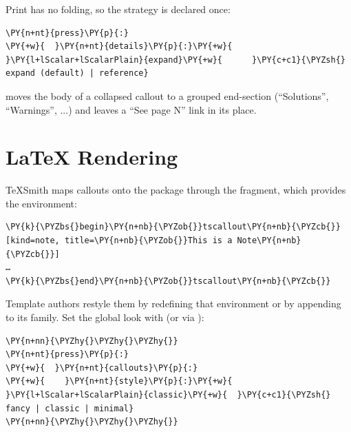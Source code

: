 \documentclass[a4paper,twoside]{article}
\begin{document}
Print has no folding, so the strategy is declared once:
\begin{tscode}[lang=yaml, engine=pygments]
\begin{Verbatim}[commandchars=\\\{\},breaklines, breakanywhere, commandchars=\\\{\}]
\PY{n+nt}{press}\PY{p}{:}
\PY{+w}{  }\PY{n+nt}{details}\PY{p}{:}\PY{+w}{ }\PY{l+lScalar+lScalarPlain}{expand}\PY{+w}{      }\PY{c+c1}{\PYZsh{} expand (default) | reference}
\end{Verbatim}
\end{tscode}
 moves the body of a collapsed callout to a grouped end-section
(``Solutions'', ``Warnings'', ...) and leaves a ``See page N'' link in its place.
\section{\LaTeX{} Rendering}
TeXSmith maps callouts onto the  package through the 
fragment, which provides the  environment:
\begin{tscode}[lang=latex, engine=pygments]
\begin{Verbatim}[commandchars=\\\{\},breaklines, breakanywhere, commandchars=\\\{\}]
\PY{k}{\PYZbs{}begin}\PY{n+nb}{\PYZob{}}tscallout\PY{n+nb}{\PYZcb{}}[kind=note, title=\PY{n+nb}{\PYZob{}}This is a Note\PY{n+nb}{\PYZcb{}}]
…
\PY{k}{\PYZbs{}end}\PY{n+nb}{\PYZob{}}tscallout\PY{n+nb}{\PYZcb{}}
\end{Verbatim}
\end{tscode}
Template authors restyle them by redefining that environment or by appending to
its  family. Set the global look with  (or via
):
\begin{tscode}[lang=yaml, engine=pygments]
\begin{Verbatim}[commandchars=\\\{\},breaklines, breakanywhere, commandchars=\\\{\}]
\PY{n+nn}{\PYZhy{}\PYZhy{}\PYZhy{}}
\PY{n+nt}{press}\PY{p}{:}
\PY{+w}{  }\PY{n+nt}{callouts}\PY{p}{:}
\PY{+w}{    }\PY{n+nt}{style}\PY{p}{:}\PY{+w}{ }\PY{l+lScalar+lScalarPlain}{classic}\PY{+w}{  }\PY{c+c1}{\PYZsh{} fancy | classic | minimal}
\PY{n+nn}{\PYZhy{}\PYZhy{}\PYZhy{}}
\end{Verbatim}
\end{tscode}
\end{document}

